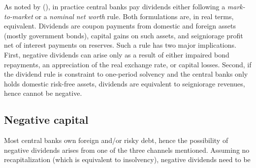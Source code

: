 \documentclass[american]{scrartcl}
\newcommand{\citein}[1]{\citeauthor{#1} (\citeyear{#1})}
\begin{document}
As noted by \citein{Hall2015}, in practice central banks pay dividends either following a \textit{mark-to-market} or a \textit{nominal net worth} rule. Both formulations are, in real terms, equivalent. Dividends are coupon payments from domestic and foreign assets (mostly government bonds), capital gains on such assets, and seigniorage profit net of interest payments on reserves. Such a rule has two major implications. First, negative dividends can arise only as a result of either impaired bond repayments, an appreciation of the real exchange rate, or capital losses. Second, if the dividend rule is constraint to one-period solvency and the central banks only holds domestic risk-free assets, dividends are equivalent to seigniorage revenues, hence cannot be negative.

\subsection{Negative capital}

Most central banks own foreign and/or risky debt, hence the possibility of negative dividends arises from one of the three channels mentioned. Assuming no recapitalization (which is equivalent to insolvency), negative dividends need to be


\newpage
\nocite{*}
\printbibliography
\end{document}
